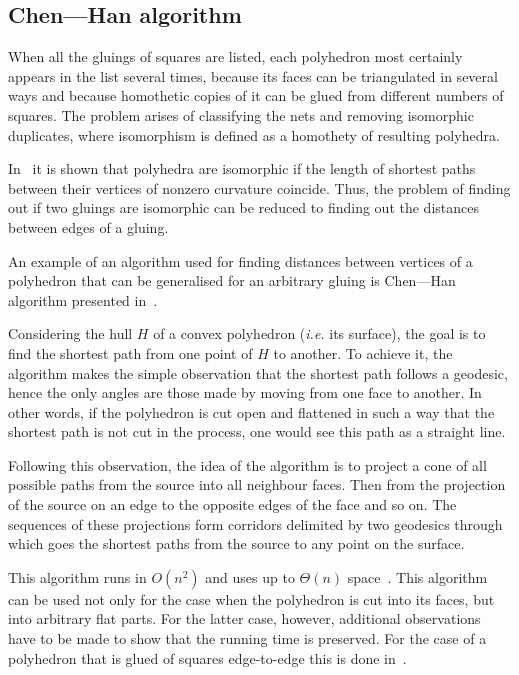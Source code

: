
\subsection{Chen—Han algorithm}

When all the gluings of squares are listed, each polyhedron most certainly appears in the list several times, because its faces can be triangulated in several ways and because homothetic copies of it can be glued from different numbers of squares. The problem arises of classifying the nets and removing isomorphic duplicates, where isomorphism is defined as a homothety of resulting polyhedra.

In~\cite{DO07} it is shown that polyhedra are isomorphic if the length of shortest paths between their vertices of nonzero curvature coincide. Thus, the problem of finding out if two gluings are isomorphic can be reduced to finding out the distances between edges of a gluing.

An example of an algorithm used for finding distances between vertices of a polyhedron that can be generalised for an arbitrary gluing is Chen—Han algorithm presented in~\cite{chen-han}.

Considering the hull $H$ of a convex polyhedron (\textit{i.e.} its surface), the goal is to find the shortest path from one point of $H$ to another. To achieve it, the algorithm makes the simple observation that the shortest path follows a geodesic, hence the only angles are those made by moving from one face to another. In other words, if the polyhedron is cut open and flattened in such a way that the shortest path is not cut in the process, one would see this path as a straight line.

Following this observation, the idea of the algorithm is to project a cone of all possible paths from the source into all neighbour faces. Then from the projection of the source on an edge to the opposite edges of the face and so on. The sequences of these projections form corridors delimited by two geodesics through which goes the shortest paths from the source to any point on the surface.

This algorithm runs in $O(n^2)$ and uses up to $\Theta(n)$ space~\cite{chen-han}. This algorithm can be used not only for the case when the polyhedron is cut into its faces, but into arbitrary flat parts. For the latter case, however, additional observations have to be made to show that the running time is preserved. For the case of a polyhedron that is glued of squares edge-to-edge this is done in~\cite{z-bachthesis}.

